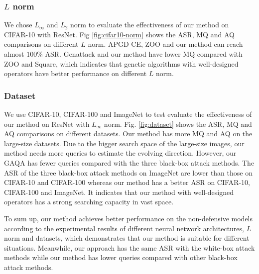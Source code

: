 \documentclass[lettersize,journal]{IEEEtran}
\begin{document}
	
	\subsubsection{$L$ norm}
	We chose $L_\infty$ and $L_2$ norm to evaluate the effectiveness of our method on CIFAR-10 with ResNet.
	Fig \ref{fig:cifar10-norm} shows the ASR, MQ and AQ comparisons on different $L$ norm. APGD-CE, ZOO and our method can reach almost $100\%$ ASR. Genattack and our method have lower MQ compared with ZOO and Square, which indicates that genetic algorithms with well-designed operators have better performance on different $L$ norm.
	
	\subsubsection{Dataset}
	We use CIFAR-10, CIFAR-100 and ImageNet to test evaluate the effectiveness of our method on ResNet with $L_\infty$ norm. 			
	Fig. \ref{fig:dataset} shows the ASR, MQ and AQ comparisons on different datasets. Our method has more MQ and AQ on the large-size datasets. Due to the bigger search space of the large-size images, our method needs more queries to estimate the evolving direction. 
	However, our GAQA has fewer queries compared with the three black-box attack methods. The ASR of the three black-box attack methods on ImageNet are lower than those on CIFAR-10 and CIFAR-100 whereas our method has a better ASR on CIFAR-10, CIFAR-100 and ImageNet. It indicates that our method with well-designed operators has a strong searching capacity in vast space. 
	
	
	To sum up, our method achieves better performance on the non-defensive models according to the experimental results of different neural network architectures, $L$ norm and datasets, which demonstrates that our method is suitable for different situations. Meanwhile, our approach has the same ASR with the white-box attack methods while our method has lower queries compared with other black-box attack methods.
	
\end{document}
